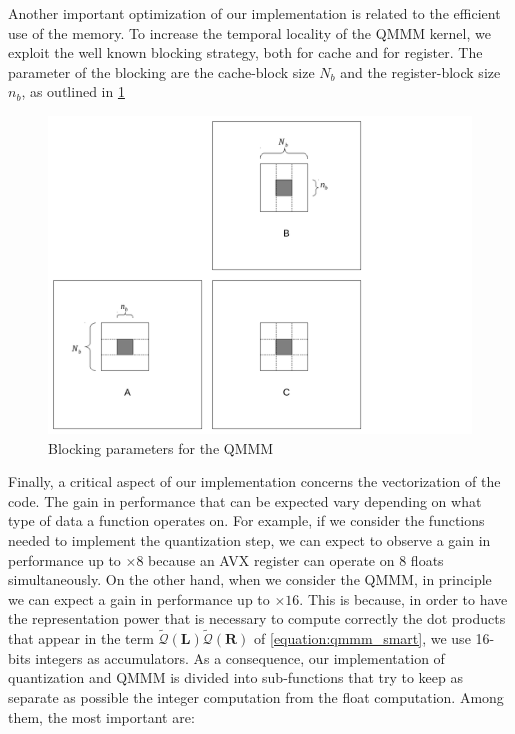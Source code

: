 Another important optimization of our implementation is related to the efficient use of the memory. To increase the temporal locality of the QMMM kernel, we exploit the well known blocking strategy, both for cache and for register. The parameter of the blocking are the cache-block size $N_b$ and the register-block size $n_b$, as outlined in \cref{fig:blocking} 

\begin{figure}
\includegraphics[scale=0.5]{figures/blocking}
\caption{Blocking parameters for the QMMM}
\label{fig:blocking}
\end{figure}


Finally, a critical aspect of our implementation concerns the vectorization of the code. The gain in performance that can be expected vary depending on what type of data a function operates on. For example, if we consider the functions needed to implement the quantization step, we can expect to observe a gain in performance up to $\times 8$ because an AVX register can operate on $8$ floats simultaneously. On the other hand, when we  consider the QMMM, in principle we can expect a gain in performance up to $\times 16$. This is because, in order to have the representation power that is necessary to compute correctly the dot products that appear in the term $ \tilde{\mathcal{Q}}(\mathbf{L}) \tilde{\mathcal{Q}}(\mathbf{R})$ of \cref{equation:qmmm_smart}, we use 16-bits integers as accumulators. As a consequence, our implementation of quantization and QMMM is divided into sub-functions that try to keep as separate as possible the integer computation from the float computation. Among them,  the most important are:

